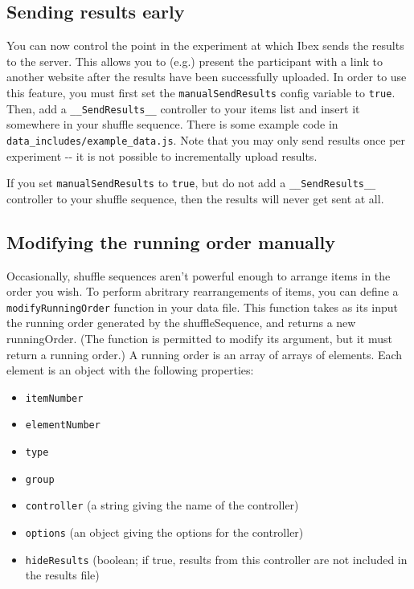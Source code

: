 \documentclass[
]{article}
\providecommand{\tightlist}{%
  \setlength{\itemsep}{0pt}\setlength{\parskip}{0pt}}
\begin{document}
\hypertarget{sending-results-early}{%
\subsection{Sending results early}\label{sending-results-early}}

You can now control the point in the experiment at which Ibex sends the
results to the server. This allows you to (e.g.) present the participant
with a link to another website after the results have been successfully
uploaded. In order to use this feature, you must first set the
\texttt{manualSendResults} config variable to \texttt{true}. Then, add a
\texttt{\_\_SendResults\_\_} controller to your items list and insert it
somewhere in your shuffle sequence. There is some example code in
\texttt{data\_includes/example\_data.js}. Note that you may only send
results once per experiment -\/- it is not possible to incrementally
upload results.

If you set \texttt{manualSendResults} to \texttt{true}, but do not add a
\texttt{\_\_SendResults\_\_} controller to your shuffle sequence, then
the results will never get sent at all.

\hypertarget{modifying-the-running-order-manually}{%
\subsection{Modifying the running order
manually}\label{modifying-the-running-order-manually}}

Occasionally, shuffle sequences aren't powerful enough to arrange items
in the order you wish. To perform abritrary rearrangements of items, you
can define a \texttt{modifyRunningOrder} function in your data file.
This function takes as its input the running order generated by the
shuffleSequence, and returns a new runningOrder. (The function is
permitted to modify its argument, but it must return a running order.) A
running order is an array of arrays of elements. Each element is an
object with the following properties:

\begin{itemize}
\tightlist
\item
  \texttt{itemNumber}
\item
  \texttt{elementNumber}
\item
  \texttt{type}
\item
  \texttt{group}
\item
  \texttt{controller} (a string giving the name of the controller)
\item
  \texttt{options} (an object giving the options for the controller)
\item
  \texttt{hideResults} (boolean; if true, results from this controller
  are not included in the results file)
\end{itemize}
\end{document}

